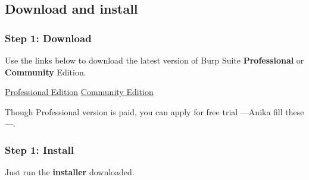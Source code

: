 \documentclass[
	a4paper, %
	12pt, %
]{CSSullivanBusinessReport}
\begin{document}
\subsection*{Download and install}

\subsubsection*{Step 1: Download}
\begin{fullwidth}
    Use the links below to download the latest version of Burp Suite \textbf{Professional} or \textbf{Community} Edition.

\begin{center}
    \href{https://portswigger.net/burp/releases/professional-community-2023-9-4?requestededition=professional&requestedplatform=}{\color{orange}Professional Edition} 
\qquad
\href{https://portswigger.net/burp/releases/professional-community-2023-9-4?requestededition=community&requestedplatform=}{\color{orange}Community Edition} 
\end{center}


Though Professional version is paid, you can apply for free trial ---{Anika fill these} ---.

\end{fullwidth}


\subsubsection*{Step 1: Install}

Just run the \textbf{installer} downloaded.


\end{document}
